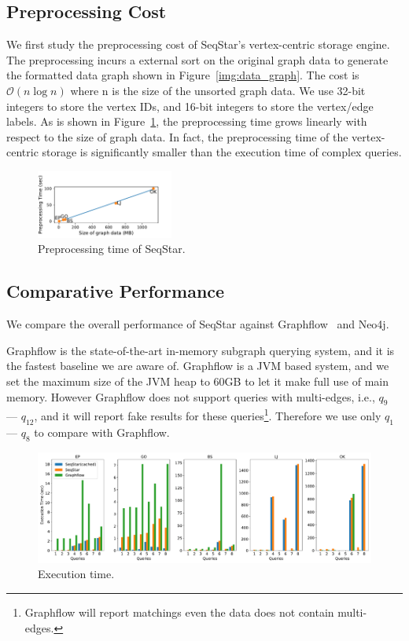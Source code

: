 \subsection{Preprocessing Cost}
We first study the preprocessing cost of SeqStar's vertex-centric storage engine.
The preprocessing incurs a external sort on the original graph data to generate the formatted data graph shown in Figure~\ref{img:data_graph}.
The cost is $\mathcal{O}(n \log n)$ where n is the size of the unsorted graph data.
We use 32-bit integers to store the vertex IDs, and 16-bit integers to store the vertex/edge labels.
As is shown in Figure~\ref{img:exp_preprocessing}, the preprocessing time grows linearly with respect to the size of graph data.
In fact, the preprocessing time of the vertex-centric storage is significantly smaller than the execution time of complex queries.

\begin{figure}[ht]
  \centering
  \includegraphics[width=0.4\textwidth]{img/exp_preprocessing.pdf}
  \caption{Preprocessing time of SeqStar.}\label{img:exp_preprocessing}
\end{figure}
\subsection{Comparative Performance}
We compare the overall performance of SeqStar against Graphflow~\cite{DBLP:journals/pvldb/MhedhbiS19} and Neo4j.

Graphflow is the state-of-the-art in-memory subgraph querying system,
and it is the fastest baseline we are aware of.
Graphflow is a JVM based system, and we set the maximum size of the JVM heap to 60GB to let it make full use of main memory.
However Graphflow does not support queries with multi-edges, i.e., $q_9$ --- $q_{12}$,
and it will report fake results for these queries\footnote{Graphflow will report matchings even the data does not contain multi-edges.}.
Therefore we use only $q_1$ --- $q_8$ to compare with Graphflow.
\begin{figure}[ht]
  \centering
  \includegraphics[width=\textwidth]{img/exp_compare.pdf}
  \caption{Execution time.}\label{img:exp_compare}
\end{figure}

